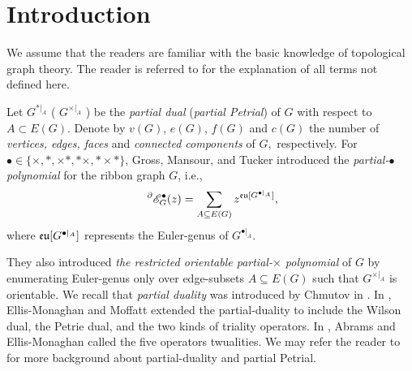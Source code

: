 \section{Introduction}

 We assume that the readers are familiar with the basic knowledge of topological graph theory.
 The reader is referred to \cite{GMT21a} for the explanation of all terms not defined here.  %



 Let  $G^{*|_A}$  ( $G^{\times|_A}$ ) be the \textit{partial dual} (\textit{partial Petrial}) of $G$ with respect to $A \subset E(G)$. Denote by $v(G)$, $e(G)$, $f(G)$ and $c(G)$  the number of \textit{vertices, edges, faces} and \textit{connected components} of $G,$ respectively.  For $\bullet \in\{\times,*, \times*, *\times, *\times*\}$, Gross, Mansour, and Tucker \cite{GMT21a} introduced the \textit{ partial-$\bullet$ polynomial} for the ribbon graph $G$, i.e.,
 $$~^{\partial}{{\mathscr{E}}}^{\bullet}_{G}(z)=\sum\limits_{A\subseteq E(G)}z^{{\mathfrak{eu}}[G^{\bullet|_A}]},$$
where ${\mathfrak{eu}}[G^{\bullet|_A}]$ represents the Euler-genus of $G^{\bullet|_A}$.

They also introduced \textit{the restricted orientable partial-$\times$ polynomial}  of $G$ by enumerating Euler-genus only over edge-subsets $A\subseteq E(G)$
such that $G^{\times|_{A}}$ is orientable. We recall that \textit{partial duality} was introduced by Chmutov in \cite{Chm09}.  In \cite{EM12},  Ellis-Monaghan and Moffatt  extended the partial-duality to include the Wilson dual, the Petrie dual, and the two kinds of triality operators. In \cite{AE19}, Abrams and Ellis-Monaghan  called the five operators twualities. We may refer the
reader to \cite{ EM13, GMT20, GMT21a, GMT21b} for more background about partial-duality and partial Petrial.

